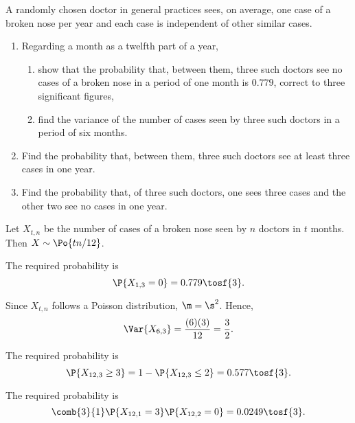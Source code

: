 \begin{problem}
    A randomly chosen doctor in general practices sees, on average, one case of a broken nose per year and each case is independent of other similar cases.

    \begin{enumerate}
        \item Regarding a month as a twelfth part of a year,
        \begin{enumerate}
            \item show that the probability that, between them, three such doctors see no cases of a broken nose in a period of one month is $0.779$, correct to three significant figures,
            \item find the variance of the number of cases seen by three such doctors in a period of six months.
        \end{enumerate}
        \item Find the probability that, between them, three such doctors see at least three cases in one year.
        \item Find the probability that, of three such doctors, one sees three cases and the other two see no cases in one year.
    \end{enumerate}
\end{problem}
\begin{solution}
    Let $X_{t,n}$ be the number of cases of a broken nose seen by $n$ doctors in $t$ months. Then $X \sim \Po{tn/12}$.
    \begin{ppart}
        \begin{psubpart}
            The required probability is \[\P{X_{1,3} = 0} = 0.779 \tosf{3}.\]
        \end{psubpart}
        \begin{psubpart}
            Since $X_{t,n}$ follows a Poisson distribution, $\m = \s^2$. Hence, \[\Var{X_{6, 3}} = \frac{(6)(3)}{12} = \frac32.\]
        \end{psubpart}
    \end{ppart}
    \begin{ppart}
        The required probability is \[\P{X_{12,3} \geq 3} = 1- \P{X_{12,3} \leq 2} = 0.577 \tosf{3}.\]
    \end{ppart}
    \begin{ppart}
        The required probability is \[\comb{3}{1} \P{X_{12,1} = 3}\P{X_{12,2} = 0} = 0.0249 \tosf{3}.\]
    \end{ppart}
\end{solution}

